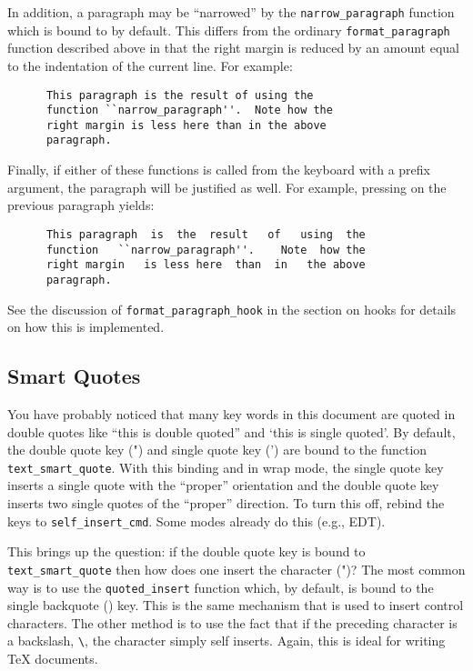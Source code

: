   In addition, a paragraph may be ``narrowed'' by the
  \verb|narrow_paragraph| function which is bound to  by default.
  This differs from the ordinary \verb|format_paragraph| function described
  above in that the right margin is reduced by an amount equal to the
  indentation of the current line. For example:
\begin{verbatim}
      This paragraph is the result of using the
      function ``narrow_paragraph''.  Note how the
      right margin is less here than in the above
      paragraph.
\end{verbatim}

  Finally, if either of these functions is called from the keyboard with a
  prefix argument, the paragraph will be justified as well.  For example,
  pressing  on the previous paragraph yields:
\begin{verbatim}
      This paragraph  is  the  result   of   using  the
      function   ``narrow_paragraph''.    Note  how the
      right margin   is less here  than  in   the above
      paragraph.
\end{verbatim}

  See the discussion of \verb|format_paragraph_hook| in the section on hooks
  for details on how this is implemented.

\subsection{Smart Quotes}

  You have probably noticed that many key words in this document are quoted
  in double quotes like ``this is double quoted'' and `this is single
  quoted'. By default, the double quote key (") and single quote key (') are
  bound to the function \verb|text_smart_quote|.  With this binding and in
  wrap mode, the single quote key inserts a single quote with the ``proper''
  orientation and the double quote key inserts two single quotes of the
  ``proper'' direction. To turn this off, rebind the keys to
  \verb|self_insert_cmd|.  Some modes already do this (e.g., EDT).

  This brings up the question: if the double quote key is bound to
  \verb|text_smart_quote| then how does one insert the character (")?  The
  most common way is to use the \verb|quoted_insert| function which, by
  default, is bound to the single backquote () key.  This is the same
  mechanism that is used to insert control characters.  The other method is
  to use the fact that if the preceding character is a backslash, \verb|\|,
  the character simply self inserts.  Again, this is ideal for writing
  \TeX{} documents.

